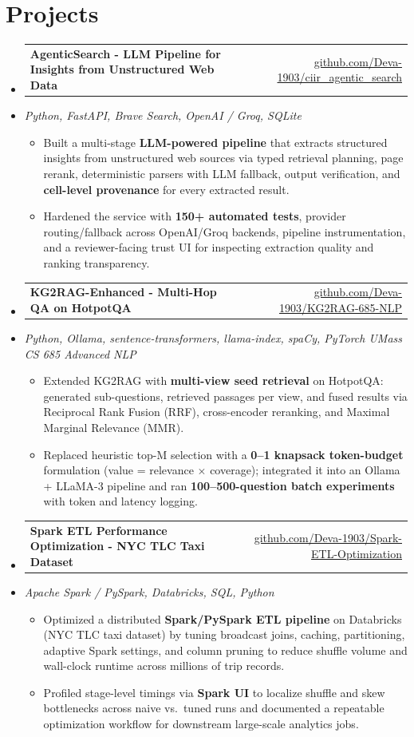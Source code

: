 \documentclass[letterpaper,10pt]{article}
\makeatletter
\newcommand{\resumeItem}[1]{
  \item\small{#1\vspace{-1pt}}
}
\newcommand{\resumeProjectHeading}[2]{
    \item
    \begin{tabular*}{0.985\textwidth}[t]{l@{\extracolsep{\fill}}r}
      \small\textbf{#1} & \small #2 \\
    \end{tabular*}\vspace{-5pt}
}
\newcommand{\resumeProjectSubheading}[1]{
  \vspace{-2pt}\item[] {\small\textcolor{ResumeSlate}{\emph{#1}}}\vspace{-3pt}
}
\newcommand{\resumeSubHeadingListStart}{\begin{itemize}[leftmargin=0.0in, label={}, itemsep=2pt, topsep=2pt]}
\newcommand{\resumeSubHeadingListEnd}{\end{itemize}}
\newcommand{\resumeItemListStart}{\begin{itemize}[leftmargin=0.18in, itemsep=2pt, topsep=1pt]}
\newcommand{\resumeItemListEnd}{\end{itemize}\vspace{-4pt}}
\makeatother
\begin{document}
\section{Projects}
\resumeSubHeadingListStart
  \resumeProjectHeading
    {AgenticSearch - LLM Pipeline for Insights from Unstructured Web Data}
    {\href{https://github.com/Deva-1903/ciir_agentic_search}{github.com/Deva-1903/ciir\_agentic\_search}}
  \resumeProjectSubheading{Python, FastAPI, Brave Search, OpenAI / Groq, SQLite}
    \resumeItemListStart
      \resumeItem{Built a multi-stage \textbf{LLM-powered pipeline} that extracts structured insights from unstructured web sources via typed retrieval planning, page rerank, deterministic parsers with LLM fallback, output verification, and \textbf{cell-level provenance} for every extracted result.}
      \resumeItem{Hardened the service with \textbf{150+ automated tests}, provider routing/fallback across OpenAI/Groq backends, pipeline instrumentation, and a reviewer-facing trust UI for inspecting extraction quality and ranking transparency.}
    \resumeItemListEnd
  \resumeProjectHeading
    {KG2RAG-Enhanced - Multi-Hop QA on HotpotQA}
    {\href{https://github.com/Deva-1903/KG2RAG-685-NLP}{github.com/Deva-1903/KG2RAG-685-NLP}}
  \resumeProjectSubheading{Python, Ollama, sentence-transformers, llama-index, spaCy, PyTorch \enspace\textbar\enspace UMass CS 685 Advanced NLP}
    \resumeItemListStart
      \resumeItem{Extended KG2RAG with \textbf{multi-view seed retrieval} on HotpotQA: generated sub-questions, retrieved passages per view, and fused results via Reciprocal Rank Fusion (RRF), cross-encoder reranking, and Maximal Marginal Relevance (MMR).}
      \resumeItem{Replaced heuristic top-M selection with a \textbf{0--1 knapsack token-budget} formulation (value = relevance \(\times\) coverage); integrated it into an Ollama + LLaMA-3 pipeline and ran \textbf{100--500-question batch experiments} with token and latency logging.}
    \resumeItemListEnd
  \resumeProjectHeading
    {Spark ETL Performance Optimization - NYC TLC Taxi Dataset}
    {\href{https://github.com/Deva-1903/Spark-ETL-Optimization}{github.com/Deva-1903/Spark-ETL-Optimization}}
  \resumeProjectSubheading{Apache Spark / PySpark, Databricks, SQL, Python}
    \resumeItemListStart
      \resumeItem{Optimized a distributed \textbf{Spark/PySpark ETL pipeline} on Databricks (NYC TLC taxi dataset) by tuning broadcast joins, caching, partitioning, adaptive Spark settings, and column pruning to reduce shuffle volume and wall-clock runtime across millions of trip records.}
      \resumeItem{Profiled stage-level timings via \textbf{Spark UI} to localize shuffle and skew bottlenecks across naive vs.\ tuned runs and documented a repeatable optimization workflow for downstream large-scale analytics jobs.}
    \resumeItemListEnd
\resumeSubHeadingListEnd
\vspace{-4pt}
\end{document}
